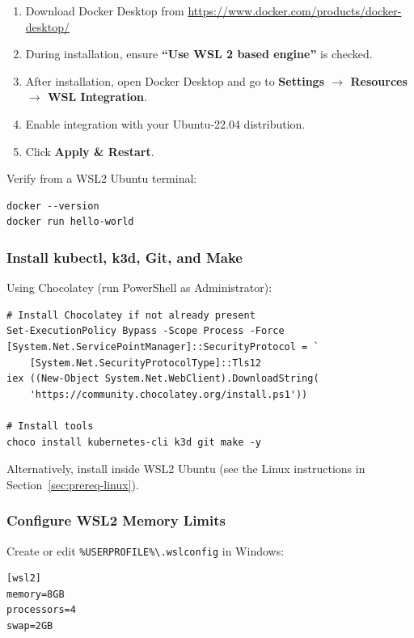 \documentclass[11pt,a4paper]{article}
\newcommand{\cmdref}[1]{\texttt{#1}}
\begin{document}
\begin{enumerate}[leftmargin=2em]
    \item Download Docker Desktop from
          \url{https://www.docker.com/products/docker-desktop/}
    \item During installation, ensure \textbf{``Use WSL 2 based engine''} is
          checked.
    \item After installation, open Docker Desktop and go to
          \textbf{Settings $\rightarrow$ Resources $\rightarrow$ WSL Integration}.
    \item Enable integration with your Ubuntu-22.04 distribution.
    \item Click \textbf{Apply \& Restart}.
\end{enumerate}

Verify from a WSL2 Ubuntu terminal:

\begin{lstlisting}[style=bash]
docker --version
docker run hello-world
\end{lstlisting}

\subsubsection{Install kubectl, k3d, Git, and Make}

Using Chocolatey (run PowerShell as Administrator):

\begin{lstlisting}[style=bash]
# Install Chocolatey if not already present
Set-ExecutionPolicy Bypass -Scope Process -Force
[System.Net.ServicePointManager]::SecurityProtocol = `
    [System.Net.SecurityProtocolType]::Tls12
iex ((New-Object System.Net.WebClient).DownloadString(
    'https://community.chocolatey.org/install.ps1'))

# Install tools
choco install kubernetes-cli k3d git make -y
\end{lstlisting}

Alternatively, install inside WSL2 Ubuntu (see the Linux instructions in
Section~\ref{sec:prereq-linux}).

\subsubsection{Configure WSL2 Memory Limits}

Create or edit \cmdref{\%USERPROFILE\%\textbackslash.wslconfig} in Windows:

\begin{lstlisting}[style=yaml]
[wsl2]
memory=8GB
processors=4
swap=2GB
\end{lstlisting}
\end{document}
